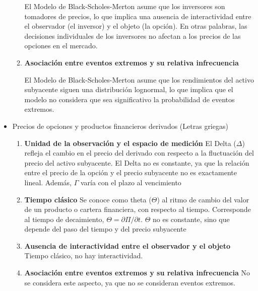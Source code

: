 \begin{problema}
\begin{sol}
\begin{itemize}
\begin{enumerate}
    El Modelo de Black-Scholes-Merton asume que los inversores son tomadores de precios, lo que implica una ausencia de interactividad entre el observador (el inversor) y el objeto (la opción). En otras palabras, las decisiones individuales de los inversores no afectan a los precios de las opciones en el mercado.
    
    \item \textbf{Asociación entre eventos extremos y su relativa infrecuencia}
    
    El Modelo de Black-Scholes-Merton asume que los rendimientos del activo subyacente siguen una distribución lognormal, lo que implica que el modelo no considera que sea significativo la probabilidad de eventos extremos.
\end{enumerate}

\item Precios de opciones y productos financieros derivados (Letras griegas)
\begin{enumerate}
\item \textbf{Unidad de la observación y el espacio de medición}
El Delta ($\Delta$) refleja el cambio en el precio del derivado con respecto a la fluctuación del precio del activo subyacente. El Delta no es constante, ya que la relación entre el precio de la opción y el precio subyacente no es exactamente lineal. Además, $\Gamma$ varía con el plazo al vencimiento

\item \textbf{Tiempo clásico}
Se conoce como theta ($\Theta$) al ritmo de cambio del valor de un producto o cartera financiera, con respecto al tiempo. Corresponde al tiempo de decaimiento, $\Theta= \partial \Pi/\partial t$. $\Theta$ no es constante, sino que depende del paso del tiempo y del precio subyacente
\item \textbf{Ausencia de interactividad entre el observador y el objeto}
Tiempo clásico, no hay interactividad. 
\item \textbf{Asociación entre eventos extremos y su relativa infrecuencia}
No se considera este aspecto, ya que no se consideran eventos extremos. 
\end{enumerate}



\end{itemize}
\end{sol}
\end{problema}
